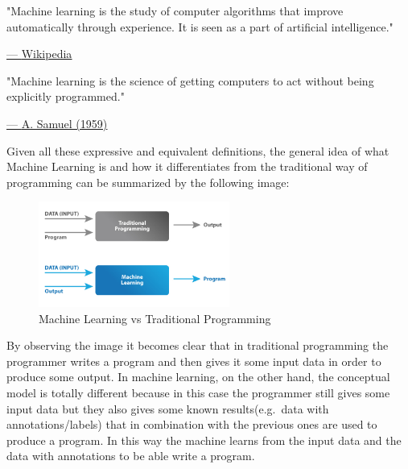 \begin{quoting}
    "Machine learning is the study of computer algorithms that improve automatically through experience. It is seen as a part of artificial intelligence."
\end{quoting}

\hspace{350pt}
\href{https://en.wikipedia.org/wiki/Machine_learning}{--- \underline{Wikipedia}}

\vspace{5mm}

\begin{quoting}
    "Machine learning is the science of getting computers to act without being explicitly programmed."
\end{quoting}

\hspace{317pt}
\href{https://en.wikipedia.org/wiki/Arthur_Samuel}{--- \underline{A. Samuel (1959)}}

\vspace{10mm}

Given all these expressive and equivalent definitions, the general idea of what Machine Learning is and how it differentiates from the traditional way of programming can be summarized by the following image:

\vspace{10mm}

\begin{figure}[h]
    \centering
    \includegraphics[width=0.56\textwidth]{../img/ML_vs_TP}
    \caption{Machine Learning vs Traditional Programming}
\end{figure}

\vspace{5mm}

By observing the image it becomes clear that in traditional programming the programmer writes a program and then gives it some input data in order to produce some output. In machine learning, on the other hand, the conceptual model is totally different because in this case the programmer still gives some input data but they also gives some known results(e.g.\ data with annotations/labels) that in combination with the previous ones are used to produce a program. In this way the machine learns from the input data and the data with annotations to be able write a program.

